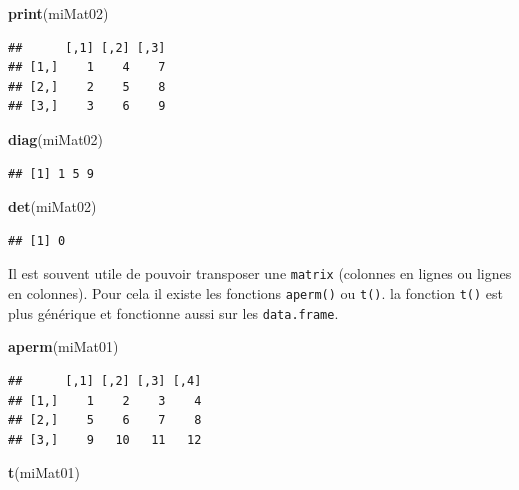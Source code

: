 \documentclass[twoside,symmetric]{book}
\newenvironment{Shaded}{}{}
\newcommand{\KeywordTok}[1]{\textbf{#1}}
\newcommand{\NormalTok}[1]{#1}
\begin{document}
\begin{Shaded}
\begin{Highlighting}[]
\KeywordTok{print}\NormalTok{(miMat02)}
\end{Highlighting}
\end{Shaded}

\begin{verbatim}
##      [,1] [,2] [,3]
## [1,]    1    4    7
## [2,]    2    5    8
## [3,]    3    6    9
\end{verbatim}

\begin{Shaded}
\begin{Highlighting}[]
\KeywordTok{diag}\NormalTok{(miMat02)}
\end{Highlighting}
\end{Shaded}

\begin{verbatim}
## [1] 1 5 9
\end{verbatim}

\begin{Shaded}
\begin{Highlighting}[]
\KeywordTok{det}\NormalTok{(miMat02)}
\end{Highlighting}
\end{Shaded}

\begin{verbatim}
## [1] 0
\end{verbatim}

Il est souvent utile de pouvoir transposer une \texttt{matrix} (colonnes en lignes ou lignes en colonnes). Pour cela il existe les fonctions \texttt{aperm()} ou \texttt{t()}. la fonction \texttt{t()} est plus générique et fonctionne aussi sur les \texttt{data.frame}.

\begin{Shaded}
\begin{Highlighting}[]
\KeywordTok{aperm}\NormalTok{(miMat01)}
\end{Highlighting}
\end{Shaded}

\begin{verbatim}
##      [,1] [,2] [,3] [,4]
## [1,]    1    2    3    4
## [2,]    5    6    7    8
## [3,]    9   10   11   12
\end{verbatim}

\begin{Shaded}
\begin{Highlighting}[]
\KeywordTok{t}\NormalTok{(miMat01)}
\end{Highlighting}
\end{Shaded}
\end{document}
